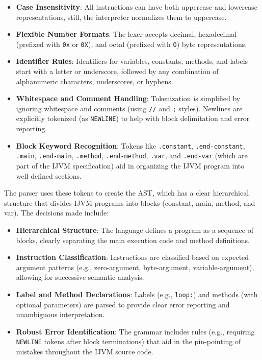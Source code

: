 \documentclass[11pt]{article}
\begin{document}
\begin{itemize}
    \item \textbf{Case Insensitivity}: All instructions can have both uppercase and lowercase representations, still, the interpreter normalizes them to uppercase.
    \item \textbf{Flexible Number Formats}: The lexer accepts decimal, hexadecimal (prefixed with \texttt{0x} or \texttt{0X}), and octal (prefixed with \texttt{O}) byte representations.
	\item \textbf{Identifier Rules}: Identifiers for variables, constants, methods, and labels start with a letter or underscore, followed by any combination of alphanumeric characters, underscores, or hyphens.
    \item \textbf{Whitespace and Comment Handling}: Tokenization is simplified by ignoring whitespace and comments (using \texttt{//} and \texttt{;} styles). Newlines are explicitly tokenized (as \texttt{NEWLINE}) to help with block delimitation and error reporting.
    \item \textbf{Block Keyword Recognition}: Tokens like \texttt{.constant}, \texttt{.end-constant}, \texttt{.main}, \texttt{.end-main}, \texttt{.method}, \texttt{.end-method}, \texttt{.var}, and \texttt{.end-var} (which are part of the IJVM specification) aid in organizing the IJVM program into well-defined sections.
\end{itemize}

The parser uses these tokens to create the AST, which has a clear hierarchical structure that divides IJVM programs into blocks (constant, main, method, and var). The decisions made include:

\begin{itemize}
    \item \textbf{Hierarchical Structure}: The language defines a program as a sequence of blocks, clearly separating the main execution code and method definitions.
    \item \textbf{Instruction Classification}: Instructions are classified based on expected argument patterns (e.g., zero-argument, byte-argument, variable-argument), allowing for successive semantic analysis.
    \item \textbf{Label and Method Declarations}: Labels (e.g., \texttt{loop:}) and methods (with optional parameters) are parsed to provide clear error reporting and unambiguous interpretation.
    \item \textbf{Robust Error Identification}: The grammar includes rules (e.g., requiring \texttt{NEWLINE} tokens after block terminations) that aid in the pin-pointing of mistakes throughout the IJVM source code.
\end{itemize}
\end{document}
